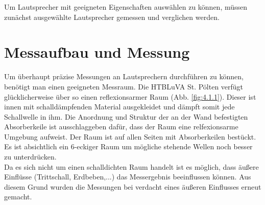 
Um Lautsprecher mit geeigneten Eigenschaften auswählen zu können, müssen zunächst ausgewählte Lautsprecher gemessen und verglichen werden.

\section{Messaufbau und Messung}\label{sec:4.1}
Um überhaupt präzise Messungen an Lautsprechern durchführen zu können, benötigt man einen geeigneten Messraum.
Die HTBLuVA St. Pölten verfügt glücklicherweise über so einen reflexionsarmer Raum (Abb. \ref{fig:4.1.1}).
Dieser ist innen mit schalldämpfenden Material ausgekleidet und dämpft somit jede Schallwelle in ihm.
Die Anordnung und Struktur der an der Wand befestigten Absorberkeile ist ausschlaggeben dafür, dass der Raum eine relfexionsarme Umgebung aufweist.
Der Raum ist auf allen Seiten mit Absorberkeilen bestückt.
Es ist absichtlich ein 6-eckiger Raum um mögliche stehende Wellen noch besser zu unterdrücken.\\
Da es sich nicht um einen schalldichten Raum handelt ist es möglich, dass äußere Einflüsse (Trittschall, Erdbeben,...) das Messergebnis beeinflussen können.
Aus diesem Grund wurden die Messungen bei verdacht eines äußeren Einflusses erneut gemacht.

